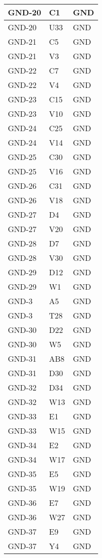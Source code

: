 \begin{footnotesize}
\begin{longtable}{|p{7cm}|p{1cm}|p{5cm}|}
GND-20	&	C1	&	GND	\\ \hline
GND-20	&	U33	&	GND	\\ \hline
GND-21	&	C5	&	GND	\\ \hline
GND-21	&	V3	&	GND	\\ \hline
GND-22	&	C7	&	GND	\\ \hline
GND-22	&	V4	&	GND	\\ \hline
GND-23	&	C15	&	GND	\\ \hline
GND-23	&	V10	&	GND	\\ \hline
GND-24	&	C25	&	GND	\\ \hline
GND-24	&	V14	&	GND	\\ \hline
GND-25	&	C30	&	GND	\\ \hline
GND-25	&	V16	&	GND	\\ \hline
GND-26	&	C31	&	GND	\\ \hline
GND-26	&	V18	&	GND	\\ \hline
GND-27	&	D4	&	GND	\\ \hline
GND-27	&	V20	&	GND	\\ \hline
GND-28	&	D7	&	GND	\\ \hline
GND-28	&	V30	&	GND	\\ \hline
GND-29	&	D12	&	GND	\\ \hline
GND-29	&	W1	&	GND	\\ \hline
GND-3	&	A5	&	GND	\\ \hline
GND-3	&	T28	&	GND	\\ \hline
GND-30	&	D22	&	GND	\\ \hline
GND-30	&	W5	&	GND	\\ \hline
GND-31	&	AB8	&	GND	\\ \hline
GND-31	&	D30	&	GND	\\ \hline
GND-32	&	D34	&	GND	\\ \hline
GND-32	&	W13	&	GND	\\ \hline
GND-33	&	E1	&	GND	\\ \hline
GND-33	&	W15	&	GND	\\ \hline
GND-34	&	E2	&	GND	\\ \hline
GND-34	&	W17	&	GND	\\ \hline
GND-35	&	E5	&	GND	\\ \hline
GND-35	&	W19	&	GND	\\ \hline
GND-36	&	E7	&	GND	\\ \hline
GND-36	&	W27	&	GND	\\ \hline
GND-37	&	E9	&	GND	\\ \hline
GND-37	&	Y4	&	GND	\\ \hline

\end{longtable}
\end{footnotesize}

